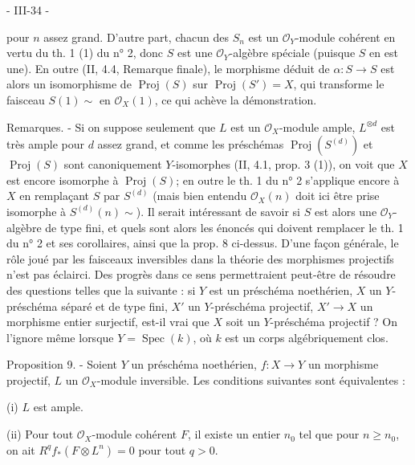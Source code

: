 \newpage



- III-34 -

pour $n$ assez grand. D'autre part, chacun des $S_n$ est un $\mathcal{O}_Y$-module cohérent en vertu du th. 1 (1) du n° 2, donc $S$ est une $\mathcal{O}_Y$-algèbre spéciale (puisque $S$ en est une). En outre (II, 4.4, Remarque finale), le morphisme déduit de $\alpha: S \to S$ est alors un isomorphisme de $\operatorname{Proj}(S)$ sur $\operatorname{Proj}(S')=X$, qui transforme le faisceau $S(1)\sim$ en $\mathcal{O}_X(1)$, ce qui achève la démonstration.

Remarques. - Si on suppose seulement que $L$ est un $\mathcal{O}_X$-module ample, $L^{\otimes d}$ est très ample pour $d$ assez grand, et comme les préschémas $\operatorname{Proj}(S^{(d)})$ et $\operatorname{Proj}(S)$ sont canoniquement $Y$-isomorphes (II, 4.1, prop. 3 (1)), on voit que $X$ est encore isomorphe à $\operatorname{Proj}(S)$; en outre le th. 1 du n° 2 s'applique encore à $X$ en remplaçant $S$ par $S^{(d)}$ (mais bien entendu $\mathcal{O}_X(n)$ doit ici être prise isomorphe à $S^{(d)}(n)\sim$). Il serait intéressant de savoir si $S$ est alors une $\mathcal{O}_Y$-algèbre de type fini, et quels sont alors les énoncés qui doivent remplacer le th. 1 du n° 2 et ses corollaires, ainsi que la prop. 8 ci-dessus. D'une façon générale, le rôle joué par les faisceaux inversibles dans la théorie des morphismes projectifs n'est pas éclairci. Des progrès dans ce sens permettraient peut-être de résoudre des questions telles que la suivante : si $Y$ est un préschéma noethérien, $X$ un $Y$-préschéma séparé et de type fini, $X'$ un $Y$-préschéma projectif, $X' \to X$ un morphisme entier surjectif, est-il vrai que $X$ soit un $Y$-préschéma projectif ? On l'ignore même lorsque $Y=\operatorname{Spec}(k)$, où $k$ est un corps algébriquement clos.

Proposition 9. - Soient $Y$ un préschéma noethérien, $f: X \to Y$ un morphisme projectif, $L$ un $\mathcal{O}_X$-module inversible. Les conditions suivantes sont équivalentes :

(i) $L$ est ample.

(ii) Pour tout $\mathcal{O}_X$-module cohérent $F$, il existe un entier $n_0$ tel que pour $n \ge n_0$, on ait $R^qf_*(F \otimes L^n) = 0$ pour tout $q > 0$.

\newpage


